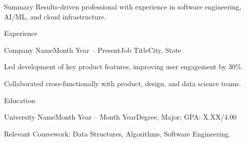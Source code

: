 \documentclass{resume}
\begin{document}
\address{City, State \\ \href{mailto:you@email.com}{you@email.com} \\ (555) 555-5555}
\address{\href{https://linkedin.com/in/yourprofile}{linkedin.com/in/yourprofile} \\ \href{https://github.com/yourgithub}{github.com/yourgithub}}

\begin{rSection}{Summary}
Results-driven professional with experience in software engineering, AI/ML, and cloud infrastructure.
\end{rSection}

\begin{rSection}{Experience}

\begin{rSubsection}{Company Name}{Month Year -- Present}{Job Title}{City, State}
\item Led development of key product features, improving user engagement by 30\%.
\item Collaborated cross-functionally with product, design, and data science teams.
\end{rSubsection}

\end{rSection}

\begin{rSection}{Education}

\begin{rSubsection}{University Name}{Month Year -- Month Year}{Degree, Major; GPA: X.XX/4.00}{}
\item Relevant Coursework: Data Structures, Algorithms, Software Engineering.
\end{rSubsection}

\end{rSection}
\end{document}
